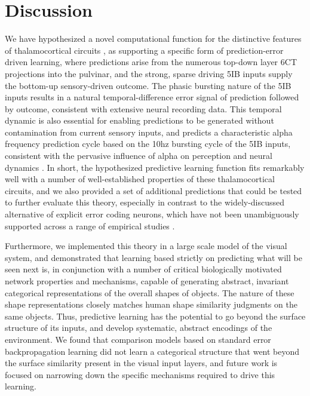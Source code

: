 \documentclass[11pt,twoside]{article}
\newif\myifpdf
\begin{document}
\section{Discussion}

We have hypothesized a novel computational function for the distinctive features of thalamocortical circuits \citep{ShermanGuillery06,UsreySherman18}, as supporting a specific form of prediction-error driven learning, where predictions arise from the numerous top-down layer 6CT projections into the pulvinar, and the strong, sparse driving 5IB inputs supply the bottom-up sensory-driven outcome. The phasic bursting nature of the 5IB inputs results in a natural temporal-difference error signal of prediction followed by outcome, consistent with extensive neural recording data.  This temporal dynamic is also essential for enabling predictions to be generated without contamination from current sensory inputs, and predicts a characteristic alpha frequency prediction cycle based on the 10hz bursting cycle of the 5IB inputs, consistent with the pervasive influence of alpha on perception and neural dynamics \citep{JensenBonnefondMarshallEtAl15,VanRullen16,ClaytonYeungKadosh18,FosterAwh19}.  In short, the hypothesized predictive learning function fits remarkably well with a number of well-established properties of these thalamocortical circuits, and we also provided a set of additional predictions that could be tested to further evaluate this theory, especially in contrast to the widely-discussed alternative of explicit error coding neurons, which have not been unambiguously supported across a range of empirical studies \citep{WalshMcGovernClarkEtAl20}.

Furthermore, we implemented this theory in a large scale model of the visual system, and demonstrated that learning based strictly on predicting what will be seen next is, in conjunction with a number of critical biologically motivated network properties and mechanisms, capable of generating abstract, invariant categorical representations of the overall shapes of objects.  The nature of these shape representations closely matches human shape similarity judgments on the same objects.  Thus, predictive learning has the potential to go beyond the surface structure of its inputs, and develop systematic, abstract encodings of the environment.   We found that comparison models based on standard error backpropagation learning did not learn a categorical structure that went beyond the surface similarity present in the visual input layers, and future work is focused on narrowing down the specific mechanisms required to drive this learning.
\end{document}
